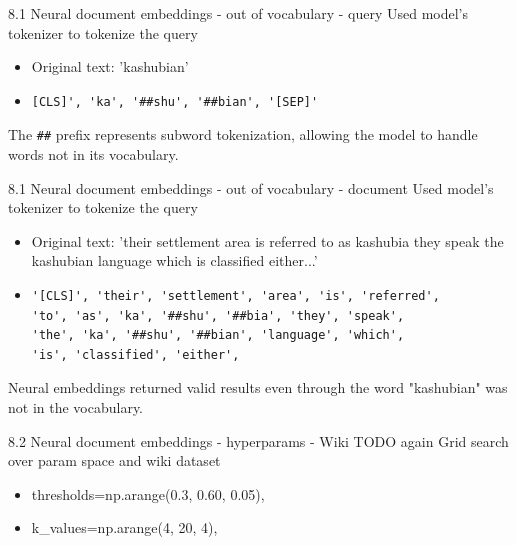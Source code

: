 \documentclass{beamer}
\begin{document}
\begin{frame}[fragile]{8.1 Neural document embeddings - out of vocabulary - query}
  Used model's tokenizer to tokenize the query
  \begin{itemize}
    \item Original text: 'kashubian'
    \item \begin{verbatim}[CLS]', 'ka', '##shu', '##bian', '[SEP]'\end{verbatim}
  \end{itemize}
  The \verb|##| prefix represents subword tokenization, allowing the model to handle words not in its vocabulary.
\end{frame}
\begin{frame}[fragile]{8.1 Neural document embeddings - out of vocabulary - document}
  Used model's tokenizer to tokenize the query
  \begin{itemize}
    \item Original text: 'their settlement area is referred to as kashubia they speak the kashubian language which is classified either...'
    \item \begin{verbatim}
'[CLS]', 'their', 'settlement', 'area', 'is', 'referred',
'to', 'as', 'ka', '##shu', '##bia', 'they', 'speak',
'the', 'ka', '##shu', '##bian', 'language', 'which',
'is', 'classified', 'either',\end{verbatim}
  \end{itemize}
  Neural embeddings returned valid results even through the word "kashubian" was not in the vocabulary.
\end{frame}

\begin{frame}{8.2 Neural document embeddings - hyperparams - Wiki}
  TODO again
  Grid search over param space and wiki dataset
  \begin{itemize}
    \item thresholds=np.arange(0.3, 0.60, 0.05),
    \item k\_values=np.arange(4, 20, 4),
  \end{itemize}
\end{frame}

\begin{frame}
  \centering
\end{frame}
\end{document}
